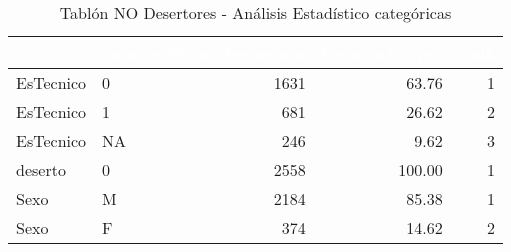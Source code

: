 
\begin{table}[!h]
	
	\caption{\label{tab:tablon_no_deserto_est_cat}Tablón NO Desertores - Análisis Estadístico categóricas}
	\centering
		\begin{tabular}[t]{llrrr}
			\toprule
			\rowcolor{black}  \multicolumn{1}{c}{\textcolor{white}{\textbf{variable}}} & \multicolumn{1}{c}{\textcolor{white}{\textbf{característica}}} & \multicolumn{1}{c}{\textcolor{white}{\textbf{frecuencia}}} & \multicolumn{1}{c}{\textcolor{white}{\textbf{frecuencia\_pct}}} & \multicolumn{1}{c}{\textcolor{white}{\textbf{rank}}}\\
			\midrule
			\rowcolor{gray!6}  EsTecnico & 0 & 1631 & 63.76 & 1\\
			EsTecnico & 1 & 681 & 26.62 & 2\\
			\rowcolor{gray!6}  EsTecnico & NA & 246 & 9.62 & 3\\
			deserto & 0 & 2558 & 100.00 & 1\\
			\rowcolor{gray!6}  Sexo & M & 2184 & 85.38 & 1\\
			\addlinespace
			Sexo & F & 374 & 14.62 & 2\\
			\bottomrule
	\end{tabular}%
\end{table}